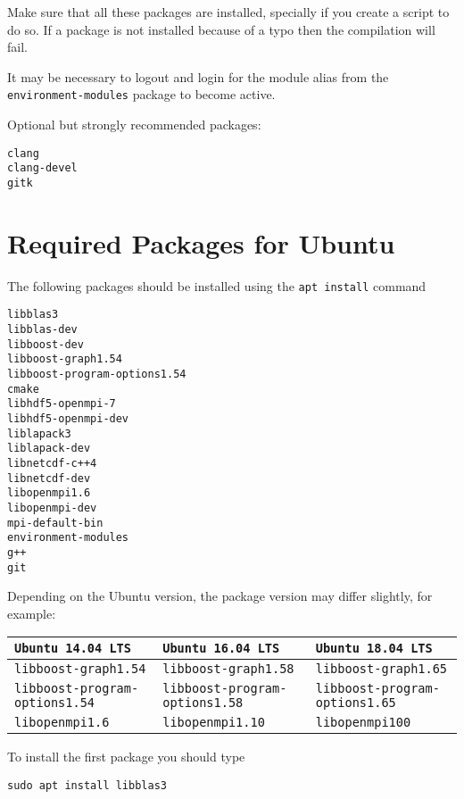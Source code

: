 \documentclass{article}
\begin{document}
Make sure that all these packages are installed, specially if you
create a script to do so. If a package is not installed because of a
typo then the compilation will fail.

It may be necessary to logout and login for the module alias from the
\verb+environment-modules+ package to become active.

Optional but strongly recommended packages:
\begin{verbatim}
clang
clang-devel
gitk
\end{verbatim}

\section{Required Packages for Ubuntu}
The following packages should be installed using the \verb+apt install+
command
\begin{verbatim}
libblas3
libblas-dev
libboost-dev
libboost-graph1.54
libboost-program-options1.54
cmake
libhdf5-openmpi-7
libhdf5-openmpi-dev
liblapack3
liblapack-dev
libnetcdf-c++4
libnetcdf-dev
libopenmpi1.6
libopenmpi-dev
mpi-default-bin
environment-modules
g++
git
\end{verbatim}

Depending on the Ubuntu version, the package version may differ slightly, for
example:

\begin{table}[H]
  \begin{center}
    \begin{tabular}{l l l}
      \toprule
      \verb+Ubuntu 14.04 LTS+ &
      \verb+Ubuntu 16.04 LTS+ &
      \verb+Ubuntu 18.04 LTS+ \\
      \midrule
      \verb+libboost-graph1.54+ &
      \verb+libboost-graph1.58+ &
      \verb+libboost-graph1.65+ \\
      \verb+libboost-program-options1.54+ &
      \verb+libboost-program-options1.58+ &
      \verb+libboost-program-options1.65+ \\
      \verb+libopenmpi1.6+ &
      \verb+libopenmpi1.10+ &
      \verb+libopenmpi100+ \\
      \bottomrule
    \end{tabular}
  \end{center}
\end{table}

To install the
first package you should type
\begin{verbatim}
sudo apt install libblas3
\end{verbatim}
\end{document}
